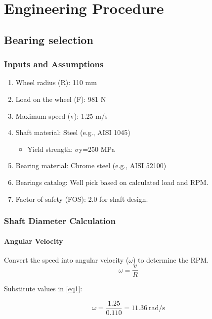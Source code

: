 \documentclass[../../main]{subfiles}
\begin{document}
\section{Engineering Procedure}

\subsection{Bearing selection}

\subsubsection{Inputs and Assumptions}

\begin{enumerate}
\def\labelenumi{\arabic{enumi}.}
\item
  Wheel radius (R): 110 mm
\item
  Load on the wheel (F): 981 N
\item
  Maximum speed (v): 1.25 m/s
\item
  Shaft material: Steel (e.g., AISI 1045)

  \begin{itemize}
  \item
    Yield strength: $\sigma$y=250 MPa
  \end{itemize}
\item
  Bearing material: Chrome steel (e.g., AISI 52100)
\item
  Bearings catalog: We\textquotesingle ll pick based on
  calculated load and RPM.
\item
  Factor of safety (FOS): 2.0 for shaft design.
\end{enumerate}

\subsubsection{ Shaft Diameter Calculation}

\paragraph{Angular Velocity}
Convert the speed into angular velocity ($\omega$) to determine the RPM.
\begin{equation}
\omega = \frac{v}{R}
\label{eq1} 
\end{equation}

Substitute values in \cref{eq1}:

$$\omega = \frac{1.25}{0.110} = 11.36 \ \text{rad/s}$$
\end{document}
